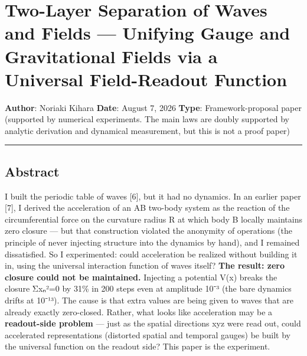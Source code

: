 \documentclass[
]{article}
\author{}
\date{}
\begin{document}
\section{Two-Layer Separation of Waves and Fields --- Unifying Gauge and
Gravitational Fields via a Universal Field-Readout
Function}\label{two-layer-separation-of-waves-and-fields-unifying-gauge-and-gravitational-fields-via-a-universal-field-readout-function}

\textbf{Author}: Noriaki Kihara \textbf{Date}: August 7, 2026
\textbf{Type}: Framework-proposal paper (supported by numerical
experiments. The main laws are doubly supported by analytic derivation
and dynamical measurement, but this is not a proof paper)

\begin{center}\rule{0.5\linewidth}{0.5pt}\end{center}

\subsection{Abstract}\label{abstract}

I built the periodic table of waves {[}6{]}, but it had no dynamics. In
an earlier paper {[}7{]}, I derived the acceleration of an AB two-body
system as the reaction of the circumferential force on the curvature
radius R at which body B locally maintains zero closure --- but that
construction violated the anonymity of operations (the principle of
never injecting structure into the dynamics by hand), and I remained
dissatisfied. So I experimented: could acceleration be realized without
building it in, using the universal interaction function of waves
itself? \textbf{The result: zero closure could not be maintained.}
Injecting a potential V(x) breaks the closure Σxₙ²=0 by 31\% in 200
steps even at amplitude 10⁻³ (the bare dynamics drifts at 10⁻¹³). The
cause is that extra values are being given to waves that are already
exactly zero-closed. Rather, what looks like acceleration may be a
\textbf{readout-side problem} --- just as the spatial directions xyz
were read out, could accelerated representations (distorted spatial and
temporal gauges) be built by the universal function on the readout side?
This paper is the experiment.
\end{document}
